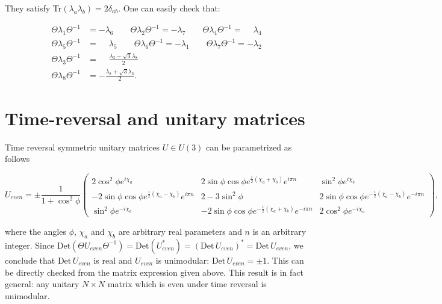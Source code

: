 \documentclass[aps,pra,showpacs,twocolumn,superscriptaddress]{revtex4-1}
\begin{document}
They satisfy Tr$(\lambda_a\lambda_b) = 2\delta_{ab}$. One can easily check that: 

\begin{equation}
\begin{aligned}
\Theta\lambda_1\Theta^{-1}&=-\lambda_6 \qquad \Theta\lambda_2\Theta^{-1}=-\lambda_7 
\qquad \Theta\lambda_4\Theta^{-1}=\phantom{-}\lambda_4 \\
\Theta\lambda_5\Theta^{-1}&=\phantom{-}\lambda_5 \qquad \Theta\lambda_6\Theta^{-1}=-\lambda_1 
\qquad \Theta\lambda_7\Theta^{-1}=-\lambda_2 \\
\Theta\lambda_3\Theta^{-1}&=\phantom{-}\frac{\lambda_3-\sqrt{3}\lambda_8}{2}\\
\Theta\lambda_8\Theta^{-1}&=-\frac{\lambda_8+\sqrt{3}\lambda_3}{2}.
\end{aligned}
\end{equation}

\section{Time-reversal and unitary matrices}
\label{app:TRU}

Time reversal symmetric unitary matrices $U \in U(3)$ can be parametrized as follows
\begin{widetext}
\begin{equation}
	U_{even}= \pm \frac{1}{1+\cos^2\phi}\left(\begin{matrix}
		2\cos^2\phi e^{i\chi_a} & 2\sin\phi\cos\phi e^{\frac{i}{2}(\chi_a+\chi_b)}e^{i\pi n} & \sin^2\phi e^{i\chi_b}\\
		-2\sin\phi\cos\phi e^{\frac{i}{2}(\chi_a-\chi_b)}e^{i\pi n} & 2-3\sin^2\phi & 2\sin\phi\cos\phi e^{-\frac{i}{2}(\chi_a-\chi_b)}e^{-i\pi n}\\
		\sin^2\phi e^{-i\chi_b} & -2\sin\phi\cos\phi e^{-\frac{i}{2}(\chi_a+\chi_b)}e^{-i\pi n} & 2\cos^2\phi e^{-i\chi_a}
	\end{matrix}\right), 
\end{equation}
\end{widetext}	
where the angles $\phi$, $\chi_a$ and $\chi_b$ are arbitrary real parameters and 
$n$ is an arbitrary integer. 
Since $\textrm{Det}(\Theta U_{even} \Theta^{-1}) = \textrm{Det}(U_{even}^*) = 
(\textrm{Det} \, U_{even})^* =  \textrm{Det} \, U_{even}$, 
we conclude that $\textrm{Det}\,U_{even}$ is real and $U_{even}$ is unimodular: 
$\textrm{Det}\,U_{even} =\pm 1$. This can be directly checked from the matrix expression given above. 
This result is in fact general: any unitary $N\times N$ matrix which is even under time reversal is unimodular. 
\end{document}
